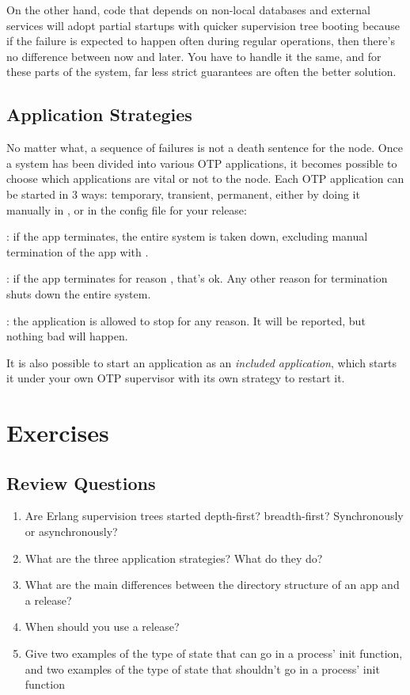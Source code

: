 On the other hand, code that depends on non-local databases and external services will adopt partial startups with quicker supervision tree booting because if the failure is expected to happen often during regular operations,
then there's no difference between now and later. You have to handle it the same, and for these parts of the system, far less strict guarantees are often the better solution.

\subsection{Application Strategies}
\label{subsec:start-link-application-strategies}

No matter what, a sequence of failures is not a death sentence for the node. Once a system has been divided into various OTP applications, it becomes possible to choose which applications are vital or not to the node. Each OTP application can be started in 3 ways: temporary, transient, permanent, either by doing it manually in , or in the config file for your release:

\begin{itemize*}
	\item {}: if the app terminates, the entire system is taken down, excluding manual termination of the app with .
	\item {}: if the app terminates for reason , that's ok. Any other reason for termination shuts down the entire system.
	\item {}: the application is allowed to stop for any reason. It will be reported, but nothing bad will happen.
\end{itemize*}

It is also possible to start an application as an \emph{included application}, which starts it under your own OTP supervisor with its own strategy to restart it.

\section{Exercises}

\subsection*{Review Questions}

\begin{enumerate}
	\item  Are Erlang supervision trees started depth-first? breadth-first? Synchronously or asynchronously?
	\item What are the three application strategies? What do they do?
	\item What are the main differences between the directory structure of an app and a release?
	\item When should you use a release?
	\item Give two examples of the type of state that can go in a process' init function, and two examples of the type of state that shouldn't go in a process' init function
\end{enumerate}

